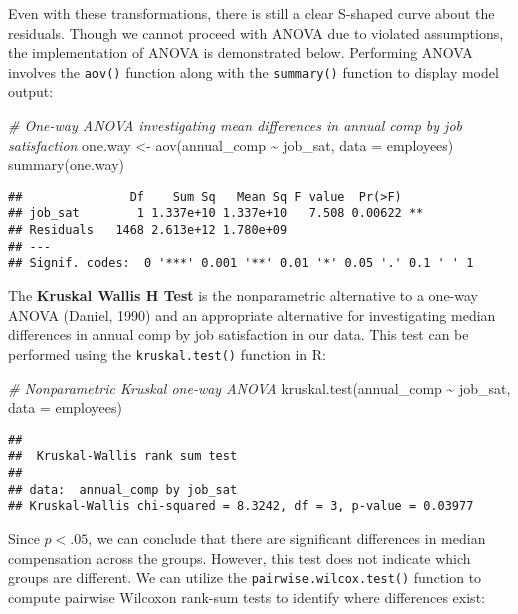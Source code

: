 \documentclass[
]{book}
\newenvironment{Shaded}{\begin{snugshade}}{\end{snugshade}}
\newcommand{\AttributeTok}[1]{\textcolor[rgb]{0.77,0.63,0.00}{#1}}
\newcommand{\CommentTok}[1]{\textcolor[rgb]{0.56,0.35,0.01}{\textit{#1}}}
\newcommand{\FunctionTok}[1]{\textcolor[rgb]{0.00,0.00,0.00}{#1}}
\newcommand{\NormalTok}[1]{#1}
\newcommand{\OtherTok}[1]{\textcolor[rgb]{0.56,0.35,0.01}{#1}}
\newcommand{\SpecialCharTok}[1]{\textcolor[rgb]{0.00,0.00,0.00}{#1}}
\begin{document}
Even with these transformations, there is still a clear S-shaped curve about the residuals. Though we cannot proceed with ANOVA due to violated assumptions, the implementation of ANOVA is demonstrated below. Performing ANOVA involves the \texttt{aov()} function along with the \texttt{summary()} function to display model output:

\begin{Shaded}
\begin{Highlighting}[]
\CommentTok{\# One{-}way ANOVA investigating mean differences in annual comp by job satisfaction}
\NormalTok{one.way }\OtherTok{\textless{}{-}} \FunctionTok{aov}\NormalTok{(annual\_comp }\SpecialCharTok{\textasciitilde{}}\NormalTok{ job\_sat, }\AttributeTok{data =}\NormalTok{ employees)}
\FunctionTok{summary}\NormalTok{(one.way)}
\end{Highlighting}
\end{Shaded}

\begin{verbatim}
##               Df    Sum Sq   Mean Sq F value  Pr(>F)   
## job_sat        1 1.337e+10 1.337e+10   7.508 0.00622 **
## Residuals   1468 2.613e+12 1.780e+09                   
## ---
## Signif. codes:  0 '***' 0.001 '**' 0.01 '*' 0.05 '.' 0.1 ' ' 1
\end{verbatim}

The \textbf{Kruskal Wallis H Test} is the nonparametric alternative to a one-way ANOVA (Daniel, 1990) and an appropriate alternative for investigating median differences in annual comp by job satisfaction in our data. This test can be performed using the \texttt{kruskal.test()} function in R:

\begin{Shaded}
\begin{Highlighting}[]
\CommentTok{\# Nonparametric Kruskal one{-}way ANOVA}
\FunctionTok{kruskal.test}\NormalTok{(annual\_comp }\SpecialCharTok{\textasciitilde{}}\NormalTok{ job\_sat, }\AttributeTok{data =}\NormalTok{ employees)}
\end{Highlighting}
\end{Shaded}

\begin{verbatim}
## 
##  Kruskal-Wallis rank sum test
## 
## data:  annual_comp by job_sat
## Kruskal-Wallis chi-squared = 8.3242, df = 3, p-value = 0.03977
\end{verbatim}

Since \(p < .05\), we can conclude that there are significant differences in median compensation across the groups. However, this test does not indicate which groups are different. We can utilize the \texttt{pairwise.wilcox.test()} function to compute pairwise Wilcoxon rank-sum tests to identify where differences exist:
\end{document}
